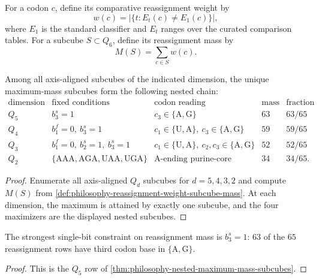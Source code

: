 \begin{definition}
\label{def:philosophy-reassignment-weight-subcube-mass}
For a codon $c$, define its comparative reassignment weight by
$$
  w(c)=|\{t:E_{t}(c)\neq E_{1}(c)\}|,
$$
where $E_{1}$ is the standard classifier and $E_{t}$ ranges over the
curated comparison tables. For a subcube $S\subset Q_{6}$, define its
reassignment mass by
$$
  M(S)=\sum_{c\in S}w(c).
$$
\end{definition}

\begin{theorem}
\label{thm:philosophy-nested-maximum-mass-subcubes}
Among all axis-aligned subcubes of the indicated dimension, the unique
maximum-mass subcubes form the following nested chain:
$$
\begin{array}{c|c|c|r|r}
  \text{dimension} & \text{fixed conditions} & \text{codon reading}
    & \text{mass} & \text{fraction}\\
\hline
  Q_{5} & b_{3}^{s}=1
    & c_{3}\in\{\mathrm{A},\mathrm{G}\} & 63 & 63/65\\
  Q_{4} & b_{1}^{f}=0,\ b_{3}^{s}=1
    & c_{1}\in\{\mathrm{U},\mathrm{A}\},\ c_{3}\in\{\mathrm{A},\mathrm{G}\}
    & 59 & 59/65\\
  Q_{3} & b_{1}^{f}=0,\ b_{2}^{s}=1,\ b_{3}^{s}=1
    & c_{1}\in\{\mathrm{U},\mathrm{A}\},\
      c_{2},c_{3}\in\{\mathrm{A},\mathrm{G}\}
    & 52 & 52/65\\
  Q_{2} & \{\mathrm{AAA},\mathrm{AGA},\mathrm{UAA},\mathrm{UGA}\}
    & \text{A-ending purine-core square} & 34 & 34/65.
\end{array}
$$
\end{theorem}
\begin{proof}
Enumerate all axis-aligned $Q_{d}$ subcubes for $d=5,4,3,2$ and compute
$M(S)$ from \autoref{def:philosophy-reassignment-weight-subcube-mass}.
At each dimension, the maximum is attained by exactly one subcube, and
the four maximizers are the displayed nested subcubes.
\end{proof}

\begin{corollary}
\label{cor:philosophy-purine-ending-reassignment-constraint}
The strongest single-bit constraint on reassignment mass is
$b_{3}^{s}=1$: $63$ of the $65$ reassignment rows have third codon base
in $\{\mathrm{A},\mathrm{G}\}$.
\end{corollary}
\begin{proof}
This is the $Q_{5}$ row of
\autoref{thm:philosophy-nested-maximum-mass-subcubes}.
\end{proof}

